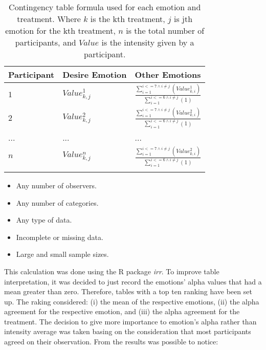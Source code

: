 \begin{table}
\caption{Contingency table formula used for each emotion and treatment. Where $k$ is the kth treatment, $j$ is jth emotion for the kth treatment, $n$ is the total number of participants, and $Value$ is the intensity given by a participant.}
\label{table:table_contingency}
\small
\begin{tabular}{|l|l|l|}
\hline
Participant & Desire Emotion & Other Emotions \\
\hline
$1$ & $Value_{k,j}^{1}$  & $\frac{\sum_{i=1}^{i<=7 \wedge i \neq j}(Value_{k,i}^{1})}{\sum_{i=1}^{i<=6 \wedge i \neq j}(1)}$\\
\hline
$2$ & $Value_{k,j}^{2}$ & $\frac{\sum_{i=1}^{i<=7 \wedge i \neq j}(Value_{k,i}^{2})}{\sum_{i=1}^{i<=6 \wedge i \neq j}(1)}$\\
\hline
... & ... & ...\\
\hline
$n$ & $Value_{k,j}^{n}$ & $\frac{\sum_{i=1}^{i<=7 \wedge i \neq j}(Value_{k,i}^{2})}{\sum_{i=1}^{i<=6 \wedge i \neq j}(1)}$\\
\hline
\multicolumn{3}{c}{}
\end{tabular}
\end{table}

\begin{itemize}
	
	\item Any number of observers.

	\item Any number of categories.

	\item Any type of data.

	\item Incomplete or missing data.

	\item Large and small sample sizes.
\end{itemize}

This calculation was done using the R package \textit{irr}. To improve table interpretation, it was decided to just record the emotions' alpha values that had a mean greater than zero. Therefore, tables with a top ten ranking have been set up. The raking considered: (i) the mean of the respective emotions, (ii) the alpha agreement for the respective emotion, and (iii) the alpha agreement for the treatment. The decision to give more importance to emotion's alpha rather than intensity average was taken basing on the consideration that most participants agreed on their observation. From the results was possible to notice:

